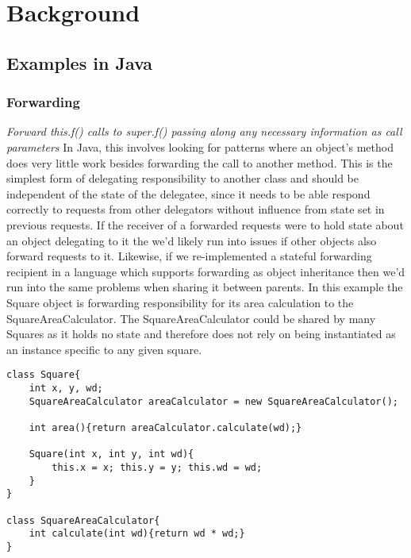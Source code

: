 \chapter{Background}\label{C:bg}

\section{Examples in Java}
\subsection{Forwarding}
\textit{Forward this.f() calls to super.f() passing along any necessary information as call parameters} \newline\newline
In Java, this involves looking for patterns where an object’s method does very little work besides forwarding the call to another method. This is the simplest form of delegating responsibility to another class and should be independent of the state of the delegatee, since it needs to be able respond correctly to requests from other delegators without influence from state set in previous requests.\newline 
If the receiver of a forwarded requests were to hold state about an object delegating to it the we’d likely run into issues if other objects also forward requests to it. Likewise, if we re-implemented a stateful forwarding recipient in a language which supports forwarding as object inheritance then we’d run into the same problems when sharing it between parents.\newline
In this example the Square object is forwarding responsibility for its area calculation to the SquareAreaCalculator. The SquareAreaCalculator could be shared by many Squares as it holds no state and therefore does not rely on being instantiated as an instance specific to any given square.

\begin{lstlisting}
class Square{
	int x, y, wd;
	SquareAreaCalculator areaCalculator = new SquareAreaCalculator();
	
	int area(){return areaCalculator.calculate(wd);}
	
	Square(int x, int y, int wd){
		this.x = x; this.y = y; this.wd = wd;
	}
}

class SquareAreaCalculator{
	int calculate(int wd){return wd * wd;}
}
\end{lstlisting}

